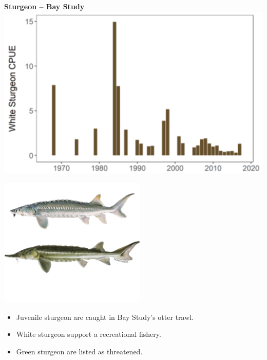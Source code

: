 \documentclass[]{article}\usepackage[]{graphicx}\usepackage[]{color}
\begin{document}
\vspace{0.5cm}

\begin{Row}
  \begin{Cell}{7}
    \begin{center}
      \vspace{-2cm}
      {\bf {\large Sturgeon – Bay Study}}
      \includegraphics[align=m]{figures/otherfish/sturgeon_bay_study.png}
    \end{center}
  \end{Cell}
  \begin{Cell}{6}
    \begin{center}
      \includegraphics[width=7cm,align=m]{figures/otherfish/sturgeon_figs.png}
      \vspace{-0.5cm}
      \begin{itemize}[leftmargin=*]
        \item Juvenile sturgeon are caught in Bay Study’s otter trawl.
        \item White sturgeon support a recreational fishery.
        \item Green sturgeon are listed as threatened.
      \end{itemize}
    \end{center}
  \end{Cell}
\end{Row}
\end{document}
